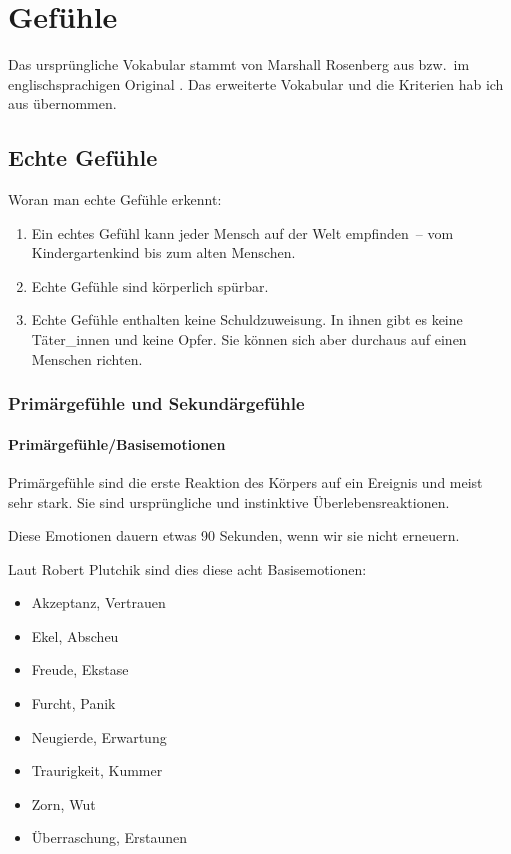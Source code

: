 \section{Gefühle}
\label{gefuehle}

Das ursprüngliche Vokabular stammt von Marshall Rosenberg aus \cite[S.~216]{gfk-rosenberg} bzw.~im englischsprachigen Original \cite[S.~210]{nvc-rosenberg}. Das erweiterte Vokabular und die Kriterien hab ich aus \cite[S.~56~f]{gfk-dummies} übernommen.


\subsection{Echte Gefühle}

Woran man echte Gefühle erkennt:

\begin{enumerate}
 \item Ein echtes Gefühl kann jeder Mensch auf der Welt empfinden~-- vom Kindergartenkind bis zum alten Menschen.
 \item Echte Gefühle sind körperlich spürbar.
 \item Echte Gefühle enthalten keine Schuldzuweisung. In ihnen gibt es keine Täter\_innen und keine Opfer. Sie können sich aber durchaus auf einen Menschen richten.
\end{enumerate}

\subsubsection{Primärgefühle und Sekundärgefühle}

\paragraph{Primärgefühle/Basisemotionen}

Primärgefühle sind die erste Reaktion des Körpers auf ein Ereignis und meist sehr stark. Sie sind ursprüngliche und instinktive Überlebensreaktionen.

Diese Emotionen dauern etwas 90 Sekunden, wenn wir sie nicht \glqq erneuern\grqq.

Laut Robert Plutchik\cite{plutchik-emotions} sind dies diese acht Basisemotionen:

\begin{itemize}
  \item Akzeptanz, Vertrauen
  \item Ekel, Abscheu
  \item Freude, Ekstase
  \item Furcht, Panik
  \item Neugierde, Erwartung
  \item Traurigkeit, Kummer
  \item Zorn, Wut
  \item Überraschung, Erstaunen
\end{itemize}

